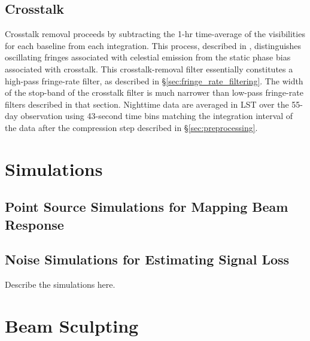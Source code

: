\documentclass[twocolumn,apj,numberedappendix]{emulateapj}
\begin{document}
\subsection{Crosstalk}

Crosstalk removal proceeds by subtracting the
1-hr time-average of the visibilities for each baseline from each integration.  This process,
described in \citet{parsons_et_al2010}, distinguishes oscillating fringes associated with 
celestial emission from the static phase bias associated with crosstalk. This crosstalk-removal
filter essentially constitutes a high-pass fringe-rate filter, as described in \S\ref{sec:fringe_rate_filtering}.
The width of the stop-band of the crosstalk filter is much narrower than low-pass fringe-rate filters described in
that section.
Nighttime data are averaged in LST over the 55-day observation using 43-second
time bins matching the integration interval of the data after the compression step described
in \S\ref{sec:preprocessing}.


\section{Simulations}
\label{sec:sim}

\subsection{Point Source Simulations for Mapping Beam Response}
\label{sec:sim_pnt}

\subsection{Noise Simulations for Estimating Signal Loss}
\label{sec:sim_nos}

Describe the simulations here.

\section{Beam Sculpting}
\label{sec:bmsculpt}
\end{document}

